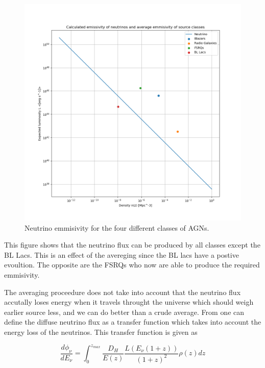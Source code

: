 \documentclass{article}
\begin{document}
\begin{figure}[H]
    \centering
    \includegraphics[width = \textwidth]{L_n_neut_calc.png}
    \caption{Neutrino emmisivity for the four different classes of AGNs.}
    \label{fig:neutrino}
\end{figure}

This figure shows that the neutrino flux can be produced by all classes except 
the BL Lacs. This is an effect of the avereging since the BL lacs have a postive evoultion.
 The opposite are the FSRQs who now are able to produce the required emmisivity.

The averaging proceedure does not take into account that the neutrino flux accutally loses energy when it travels throught the universe which should weigh earlier source less, and we can do better than a crude average. 
From \cite{Palladino_2020} one can define the diffuse neutrino flux as a transfer function which takes into account the energy loss of the neutrinos. This transfer function is given as

\begin{equation}
    \frac{d\phi_\nu}{dE_\nu} = \int_0^{z_{max}} \frac{D_H}{E(z)} \frac{L(E_\nu (1+z))}{(1+z)^2} \rho(z) dz
\end{equation}
\end{document}

